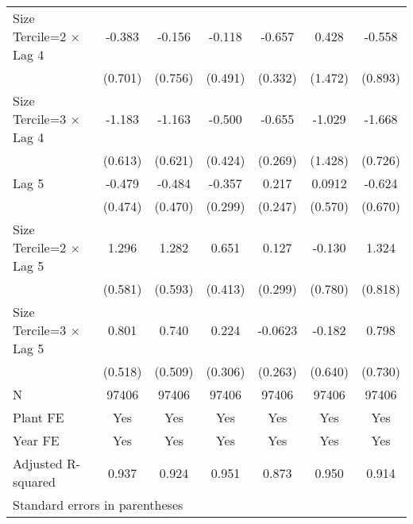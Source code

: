 \begin{table}[htbp]
\begin{tabular}{l*{6}{c}}
\addlinespace
Size Tercile=2 $\times$ Lag 4&   -0.383         &   -0.156         &   -0.118         &   -0.657\sym{*}  &    0.428         &   -0.558         \\
                &  (0.701)         &  (0.756)         &  (0.491)         &  (0.332)         &  (1.472)         &  (0.893)         \\
\addlinespace
Size Tercile=3 $\times$ Lag 4&   -1.183         &   -1.163         &   -0.500         &   -0.655\sym{*}  &   -1.029         &   -1.668\sym{*}  \\
                &  (0.613)         &  (0.621)         &  (0.424)         &  (0.269)         &  (1.428)         &  (0.726)         \\
\addlinespace
Lag 5           &   -0.479         &   -0.484         &   -0.357         &    0.217         &   0.0912         &   -0.624         \\
                &  (0.474)         &  (0.470)         &  (0.299)         &  (0.247)         &  (0.570)         &  (0.670)         \\
\addlinespace
Size Tercile=2 $\times$ Lag 5&    1.296\sym{*}  &    1.282\sym{*}  &    0.651         &    0.127         &   -0.130         &    1.324         \\
                &  (0.581)         &  (0.593)         &  (0.413)         &  (0.299)         &  (0.780)         &  (0.818)         \\
\addlinespace
Size Tercile=3 $\times$ Lag 5&    0.801         &    0.740         &    0.224         &  -0.0623         &   -0.182         &    0.798         \\
                &  (0.518)         &  (0.509)         &  (0.306)         &  (0.263)         &  (0.640)         &  (0.730)         \\
\midrule
N               &    97406         &    97406         &    97406         &    97406         &    97406         &    97406         \\
Plant FE        &      Yes         &      Yes         &      Yes         &      Yes         &      Yes         &      Yes         \\
Year FE         &      Yes         &      Yes         &      Yes         &      Yes         &      Yes         &      Yes         \\
Adjusted R-squared&    0.937         &    0.924         &    0.951         &    0.873         &    0.950         &    0.914         \\
\bottomrule
\multicolumn{7}{l}{\footnotesize Standard errors in parentheses}\\

\end{tabular}
\end{table}
